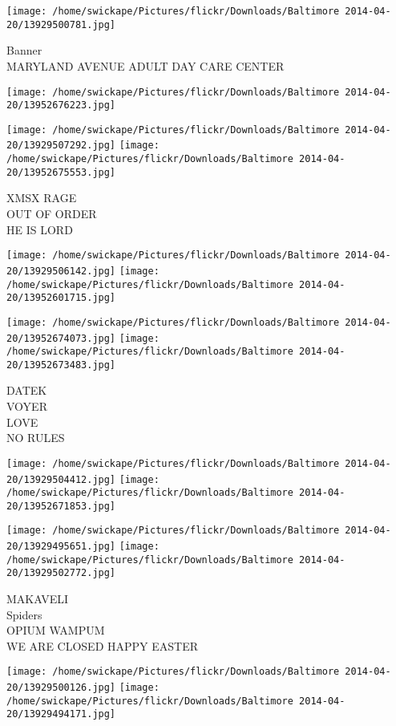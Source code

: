 \documentclass[10pt,letterpaper]{article}
\begin{document}
\vspace{0.25in}
\texttt{[image: /home/swickape/Pictures/flickr/Downloads/Baltimore 2014-04-20/13929500781.jpg]}

Banner\\
MARYLAND AVENUE ADULT DAY CARE CENTER
\pagebreak

\texttt{[image: /home/swickape/Pictures/flickr/Downloads/Baltimore 2014-04-20/13952676223.jpg]}

\vspace{0.25in}
\texttt{[image: /home/swickape/Pictures/flickr/Downloads/Baltimore 2014-04-20/13929507292.jpg]}
\texttt{[image: /home/swickape/Pictures/flickr/Downloads/Baltimore 2014-04-20/13952675553.jpg]}

XMSX RAGE\\
OUT OF ORDER\\
HE IS LORD
\pagebreak

\texttt{[image: /home/swickape/Pictures/flickr/Downloads/Baltimore 2014-04-20/13929506142.jpg]}
\texttt{[image: /home/swickape/Pictures/flickr/Downloads/Baltimore 2014-04-20/13952601715.jpg]}

\texttt{[image: /home/swickape/Pictures/flickr/Downloads/Baltimore 2014-04-20/13952674073.jpg]}
\texttt{[image: /home/swickape/Pictures/flickr/Downloads/Baltimore 2014-04-20/13952673483.jpg]}

DATEK\\
VOYER\\
LOVE\\
NO RULES
\pagebreak

\texttt{[image: /home/swickape/Pictures/flickr/Downloads/Baltimore 2014-04-20/13929504412.jpg]}
\texttt{[image: /home/swickape/Pictures/flickr/Downloads/Baltimore 2014-04-20/13952671853.jpg]}

\texttt{[image: /home/swickape/Pictures/flickr/Downloads/Baltimore 2014-04-20/13929495651.jpg]}
\texttt{[image: /home/swickape/Pictures/flickr/Downloads/Baltimore 2014-04-20/13929502772.jpg]}

MAKAVELI\\
Spiders\\
OPIUM WAMPUM\\
WE ARE CLOSED HAPPY EASTER
\pagebreak

\texttt{[image: /home/swickape/Pictures/flickr/Downloads/Baltimore 2014-04-20/13929500126.jpg]}
\texttt{[image: /home/swickape/Pictures/flickr/Downloads/Baltimore 2014-04-20/13929494171.jpg]}
\end{document}
